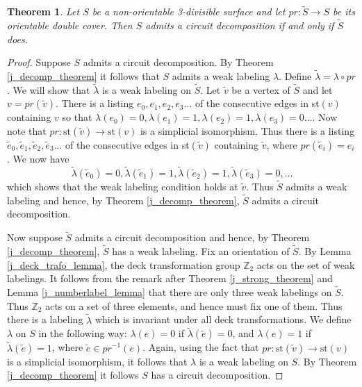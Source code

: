 \documentclass[12pt]{article}
\newtheorem{theorem}{Theorem}
\theoremstyle{definition}
\begin{document}
\begin{theorem}\label{j_double_theorem}
    Let $S$ be a non-orientable 3-divisible surface and let $pr\colon\tilde S\to S$ be its orientable double cover. Then $S$ admits a circuit decomposition if and only if $\tilde S$ does.
\end{theorem}
\begin{proof}
    Suppose $S$ admits a circuit decomposition. By Theorem \ref{j_decomp_theorem} it follows that $S$ admits a weak labeling $\lambda$. Define $\tilde\lambda=\lambda\circ pr$. We will show that $\tilde\lambda$ is a weak labeling on $\tilde S$. Let $\tilde v$ be a vertex of $\tilde S$ and let $v=pr(\tilde v)$. There is a listing $e_0, e_1, e_2, e_3\dots $ of the consecutive edges in st$(v)$ containing $v$ so that $\lambda(e_0)=0, \lambda(e_1)=1, \lambda(e_2)=1, \lambda(e_3)=0 \ldots $. Now note that $pr\colon \text{st}(\tilde v)\to \text{st}(v)$ is a simplicial isomorphism. Thus there is a listing $\tilde e_0, \tilde e_1, \tilde e_2, \tilde e_3\ldots $ of the consecutive edges in st$(\tilde v)$ containing $\tilde v$, where $pr(\tilde e_i)=e_i$. We now have 
    $$\tilde \lambda(\tilde e_0)=0, \tilde\lambda(\tilde e_1)=1, \tilde\lambda(\tilde e_2)=1, \tilde\lambda(\tilde e_3)=0, \ldots $$
    which shows that the weak labeling condition holds at $\tilde v$.
    Thus $\tilde S$ admits a weak labeling and hence, by Theorem \ref{j_decomp_theorem},  $\tilde S$ admits a circuit decomposition.

    Now suppose $\tilde S$ admits a circuit decomposition and hence, by Theorem \ref{j_decomp_theorem}, $\tilde S$ has a weak labeling. Fix an orientation of $\tilde S$.
    By Lemma \ref{j_deck_trafo_lemma}, the deck transformation group $\mathbb Z_2$ acts on the set of weak labelings. It follows from the remark after Theorem \ref{j_strong_theorem} and Lemma \ref{j_numberlabel_lemma} that there are only three weak labelings on $\tilde S$. Thus $\mathbb Z_2$ acts on a set of three elements, and hence must fix one of them. Thus there is a labeling $\tilde \lambda$ which is invariant under all deck transformations. We define $\lambda$ on $S$ in the following way: $\lambda(e)=0$ if $\tilde \lambda(\tilde e)=0$, and $\lambda(e)=1$ if $\tilde \lambda(\tilde e)=1$, where $\tilde e\in pr^{-1}(e)$. Again, using the fact that $pr\colon \text{st}(\tilde v)\to \text{st}(v)$ is a simplicial isomorphism, it follows that $\lambda$ is a weak labeling on $S$. By Theorem \ref{j_decomp_theorem} it follows $S$ has a circuit decomposition.
\end{proof}
\end{document}
